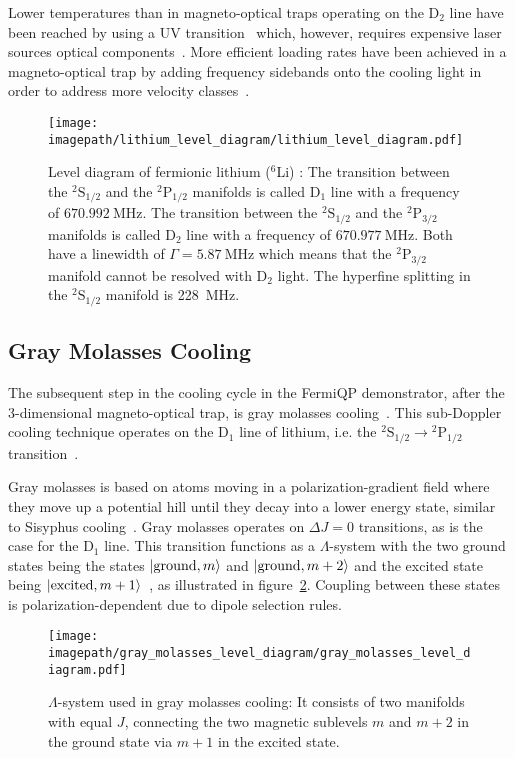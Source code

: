 Lower temperatures than in magneto-optical traps operating on the D$_2$ line have been reached by using a UV transition~\cite{duarte_all-optical_2011,omran_microscopic_2015} which, however, requires expensive laser sources optical components~\cite{burchianti_efficient_2014}. More efficient loading rates have been achieved in a magneto-optical trap by adding frequency sidebands onto the cooling light in order to address more velocity classes~\cite{li_enhanced_2015}.

\begin{figure}
    \centering
    \texttt{[image: \\imagepath/lithium\_level\_diagram/lithium\_level\_diagram.pdf]}
    \caption{Level diagram of fermionic lithium ($^6$Li) \cite{gehm_properties_2003, scherf_re-measurement_1996}: The transition between the  $^2\text{S}_{1/2}$ and the $^2\text{P}_{1/2}$ manifolds is called D$_1$ line with a frequency of $\SI{670.992}{\mega\hertz}$. The transition between the  $^2\text{S}_{1/2}$ and the $^2\text{P}_{3/2}$ manifolds is called D$_2$ line with a frequency of $\SI{670.977}{\mega\hertz}$. Both have a linewidth of $\Gamma = \SI{5.87}{\mega\hertz}$ which means that the $^2\text{P}_{3/2}$ manifold cannot be resolved with D$_2$ light. The hyperfine splitting in the $^2\text{S}_{1/2}$ manifold is \SI{228}{\mega\hertz}.}
    \label{fig:lithium_level_diagram}
\end{figure}

\subsection*{Gray Molasses Cooling}
The subsequent step in the cooling cycle in the FermiQP demonstrator, after the 3-dimensional magneto-optical trap, is gray molasses cooling~\cite{grynberg_proposal_1994,weidemuller_novel_1994}. This sub-Doppler cooling technique operates on the D$_1$ line of lithium, i.e. the $^2\text{S}_{1/2} \rightarrow {^2\text{P}_{1/2}}$ transition~\cite{burchianti_efficient_2014}.

Gray molasses is based on atoms moving in a polarization-gradient field where they move up a potential hill until they decay into a lower energy state, similar to Sisyphus cooling~\cite{foot_atomic_2005}. Gray molasses operates on $\Delta J = 0$ transitions, as is the case for the D$_1$ line. This transition functions as a $\Lambda$-system with the two ground states being the states $\Ket{\text{ground}, m}$ and $\Ket{\text{ground}, m + 2}$ and the excited state being $\Ket{\text{excited}, m + 1}$~\cite{weidemuller_novel_1994}, as illustrated in figure~\ref{fig:gray_molasses_level_diagram}. Coupling between these states is polarization-dependent due to dipole selection rules.
\begin{figure}
    \centering
    \texttt{[image: \\imagepath/gray\_molasses\_level\_diagram/gray\_molasses\_level\_diagram.pdf]}
    \caption{$\Lambda$-system used in gray molasses cooling: It consists of two manifolds with equal $J$, connecting the two magnetic sublevels $m$ and $m+2$ in the ground state via $m+1$ in the excited state.}
    \label{fig:gray_molasses_level_diagram}
\end{figure}

